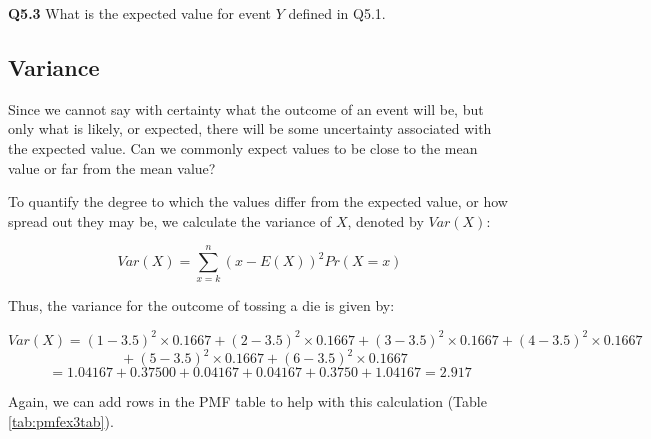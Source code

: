\documentclass[
  oneside]{krantz}
\begin{document}
\textbf{Q5.3} What is the expected value for event \(Y\) defined in Q5.1.

\hypertarget{variance}{%
\subsection{Variance}\label{variance}}

Since we cannot say with certainty what the outcome of an event will be, but only what is likely, or expected, there will be some uncertainty associated with the expected value. Can we commonly expect values to be close to the mean value or far from the mean value?

To quantify the degree to which the values differ from the expected value, or how spread out they may be, we calculate the variance of \(X\), denoted by \(Var(X)\):

\begin{equation}
Var(X) = \sum_{x=k}^n (x - E(X))^2Pr(X=x)
\label{discvarx}
\end{equation}

Thus, the variance for the outcome of tossing a die is given by:

\[Var(X)= (1-3.5)^2 \times 0.1667 + (2-3.5)^2 \times 0.1667 + (3-3.5)^2 \times 0.1667 + (4-3.5)^2 \times 0.1667\]
\[ \; \; + (5-3.5)^2 \times 0.1667 + (6-3.5)^2 \times 0.1667\]
\[= 1.04167 + 0.37500 + 0.04167 + 0.04167 + 0.3750 + 1.04167 = 2.917 \]

Again, we can add rows in the PMF table to help with this calculation (Table \ref{tab:pmfex3tab}).
\end{document}
